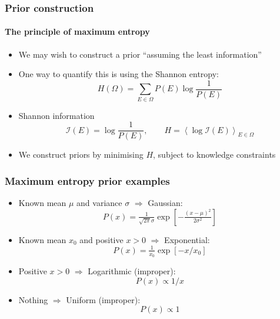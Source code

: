 \documentclass[%
]{beamer}
\begin{document}
\begin{frame}
    \frametitle{Prior construction}
    \framesubtitle{The principle of maximum entropy}
    \begin{itemize}
        \item We may wish to construct a prior ``assuming the least information''
        \item One way to quantify this is using the Shannon entropy:
            \begin{equation}
                H(\Omega) 
                = \sum_{E\in \Omega} P(E) \log \frac{1}{P(E)}
                \nonumber
            \end{equation}
        \item Shannon information 
            \begin{equation}
                \mathcal{I}(E) = \log \frac{1}{P(E)},
                \qquad
                H = \left\langle\log \mathcal{I}(E)\right\rangle_{E\in \Omega}
                \nonumber
            \end{equation}
        \item We construct priors by minimising $H$, subject to knowledge constraints
    \end{itemize}
\end{frame}

\begin{frame}
    \frametitle{Maximum entropy prior examples}
    \begin{itemize}
        \item Known mean $\mu$ and variance $\sigma$ $\Rightarrow$ Gaussian:
            \begin{equation}
                P(x) = \tfrac{1}{\sqrt{2\pi}\sigma}\exp\left[-\tfrac{{(x-\mu)}^2}{2\sigma^2}\right]
                \nonumber
            \end{equation}
        \item Known mean $x_0$ and positive $x>0$ $\Rightarrow$ Exponential:
            \begin{equation}
                P(x) = \tfrac{1}{x_0}\exp\left[-x/x_0\right]
                \nonumber
            \end{equation}
        \item Positive $x>0$ $\Rightarrow$ Logarithmic (improper):
            \begin{equation}
                P(x) \propto 1/x
                \nonumber
            \end{equation}
        \item Nothing  $\Rightarrow$ Uniform (improper):
            \begin{equation}
                P(x) \propto 1
                \nonumber
            \end{equation}
    \end{itemize}
\end{frame}
\end{document}
